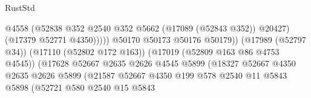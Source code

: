 \begin{lexlean}{RustStd}
\begin{coremodule}
                                                            @4558
                                                            (@52838
                                                              @352
                                                              @2540
                                                              @352
                                                              @5662
                                                              (@17089 (@52843 @352))
                                                              @20427)
                                                            (@17379 @52771 @4350)))))
                                                    @50170
                                                    @50173
                                                    @50176
                                                    @50179))
                                                (@17989 (@52797 @34))
                                                (@17110 (@52802 @172 @163))
                                                (@17019 (@52809 @163 @86 @4753 @4545))
                                                (@17628
                                                  @52667
                                                  @2635
                                                  @2626
                                                  @4545
                                                  @5899
                                                  (@18327
                                                    @52667
                                                    @4350
                                                    @2635
                                                    @2626
                                                    @5899
                                                    (@21587
                                                      @52667
                                                      @4350
                                                      @199
                                                      @578
                                                      @2540
                                                      @11
                                                      @5843
                                                      @5898
                                                      (@52721
                                                        @580
                                                        @2540
                                                        @15
                                                        @5843

\end{coremodule}
\end{lexlean}
